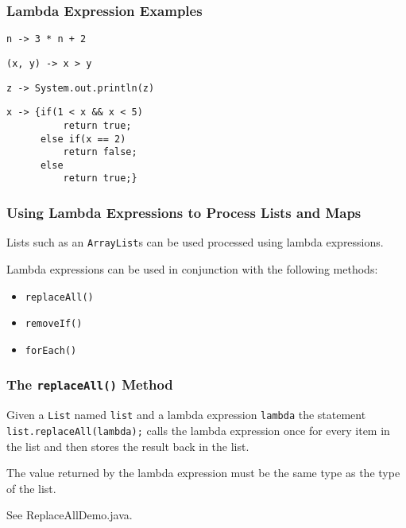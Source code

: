 \documentclass{beamer}
\newcommand{\mil}[1]{\texttt{#1}}
\begin{document}
\begin{frame}[fragile]
    
    \frametitle{Lambda Expression Examples}
    
    \mil{n -> 3 * n + 2}
    
    \bigskip
    
    \mil{(x, y) -> x > y}

    \bigskip
        
    \mil{z -> System.out.println(z)}
    
    \bigskip

\begin{verbatim}
x -> {if(1 < x && x < 5)
          return true;
      else if(x == 2)
          return false;
      else
          return true;}
\end{verbatim}

\end{frame}

\begin{frame}

    \frametitle{Using Lambda Expressions to Process Lists and Maps}
    
    Lists such as an \mil{ArrayList}s can be used processed using lambda expressions.
    
    \bigskip
    
    Lambda expressions can be used in conjunction with the following methods:
    
    \bigskip
    
        \begin{itemize}
        
            \item \mil{replaceAll()}
            
            \item \mil{removeIf()}
            
            \item \mil{forEach()}
        
        \end{itemize}
     
\end{frame}

\begin{frame}

    \frametitle{The \mil{replaceAll()} Method}
    
    Given a \mil{List} named \mil{list} and a lambda expression \mil{lambda} the statement \mil{list.replaceAll(lambda);} calls the lambda expression once for every item in the list and then stores the result back in the list.
    
    \bigskip
    
    The value returned by the lambda expression must be the same type as the type of the list.
    
    \bigskip
    
    See ReplaceAllDemo.java.
       
\end{frame}
\end{document}
